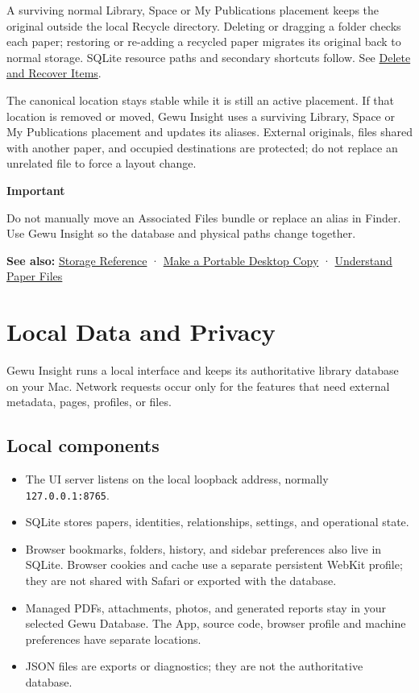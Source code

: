 \documentclass[10pt,letterpaper,oneside]{scrreprt}
\providecommand{\tightlist}{\setlength{\itemsep}{1pt}\setlength{\parskip}{0pt}}
\newenvironment{GewuRelated}{\par\nobreak\vspace{3pt}\nobreak\begingroup\small\sffamily\begin{samepage}\noindent}{\par\end{samepage}\endgroup}
\newenvironment{GewuLead}
  {\begin{list}{}{\leftmargin=0pt\rightmargin=0pt\topsep=0pt\partopsep=0pt\parsep=0pt}\item\relax
    \sffamily\fontsize{10.5}{13.2}\selectfont\color{GewuMuted}}
  {\end{list}}
\renewenvironment{quote}
  {\Needspace{5\baselineskip}\begin{tcolorbox}[enhanced,breakable,colback=GewuPale,colframe=GewuPale,boxrule=0pt,
    borderline west={1.6pt}{0pt}{GewuBlue},arc=1.2mm,left=2.5mm,right=2.5mm,top=1.7mm,bottom=1.7mm,
    before skip=4pt,after skip=5pt,fontupper=\color{GewuInk}\small]}
  {\end{tcolorbox}}
\begin{document}
A surviving normal Library, Space or My Publications placement keeps the original outside the local Recycle directory. Deleting or dragging a folder checks each paper; restoring or re-adding a recycled paper migrates its original back to normal storage. SQLite resource paths and secondary shortcuts follow. See \hyperref[recycle]{Delete and Recover Items}.

The canonical location stays stable while it is still an active placement. If that location is removed or moved, Gewu Insight uses a surviving Library, Space or My Publications placement and updates its aliases. External originals, files shared with another paper, and occupied destinations are protected; do not replace an unrelated file to force a layout change.

\begin{quote}
\textbf{Important}

Do not manually move an Associated Files bundle or replace an alias in Finder. Use Gewu Insight so the database and physical paths change together.
\end{quote}

\begin{GewuRelated}
\textbf{See also:} \hyperref[storage-reference]{Storage Reference} · \hyperref[desktop-copy]{Make a Portable Desktop Copy} · \hyperref[paper-files]{Understand Paper Files}
\end{GewuRelated}

\section{Local Data and Privacy}\label{privacy}

\begin{GewuLead}
Gewu Insight runs a local interface and keeps its authoritative library database on your Mac. Network requests occur only for the features that need external metadata, pages, profiles, or files.
\end{GewuLead}

\subsection{Local components}\label{local-components}

\begin{itemize}
\tightlist
\item
  The UI server listens on the local loopback address, normally \texttt{127.0.0.1:8765}.
\item
  SQLite stores papers, identities, relationships, settings, and operational state.
\item
  Browser bookmarks, folders, history, and sidebar preferences also live in SQLite. Browser cookies and cache use a separate persistent WebKit profile; they are not shared with Safari or exported with the database.
\item
  Managed PDFs, attachments, photos, and generated reports stay in your selected Gewu Database. The App, source code, browser profile and machine preferences have separate locations.
\item
  JSON files are exports or diagnostics; they are not the authoritative database.
\end{itemize}
\end{document}
